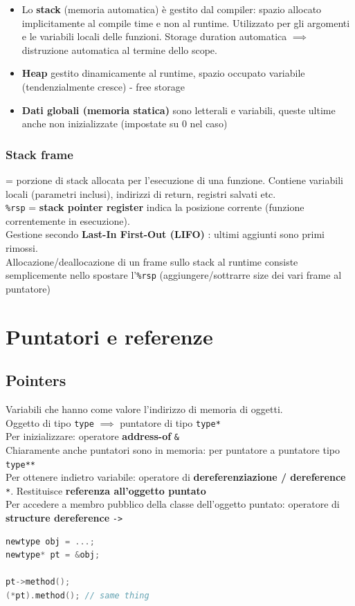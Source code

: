 \documentclass[10pt, oneside]{book}
\begin{document}
\begin{itemize}
\item Lo \textbf{stack} (memoria automatica) è gestito dal compiler: spazio allocato implicitamente al compile time e non al runtime. Utilizzato per gli argomenti e le variabili locali delle funzioni. Storage duration automatica $\implies$ distruzione automatica al termine dello scope.
\item \textbf{Heap} gestito dinamicamente al runtime, spazio occupato variabile (tendenzialmente cresce) - free storage
\item \textbf{Dati globali (memoria statica)} sono letterali e variabili, queste ultime anche non inizializzate (impostate su 0 nel caso)
\end{itemize}

\subsection{Stack frame}
= porzione di stack allocata per l'esecuzione di una funzione. Contiene variabili locali (parametri inclusi), indirizzi di return, registri salvati etc.\\
\texttt{\%rsp} = \textbf{stack pointer register} indica la posizione corrente (funzione correntemente in esecuzione).\\
Gestione secondo \textbf{Last-In First-Out (LIFO)} : ultimi aggiunti sono primi rimossi.\\
Allocazione/deallocazione di un frame sullo stack al runtime consiste semplicemente nello spostare l'\texttt{\%rsp} (aggiungere/sottrarre size dei vari frame al puntatore)



\chapter{Puntatori e referenze}

\section{Pointers}
Variabili che hanno come valore l'indirizzo di memoria di oggetti.\\
Oggetto di tipo \texttt{type} $\implies$ puntatore di tipo \texttt{type*}\\
Per inizializzare: operatore \textbf{address-of} \texttt{\&}\\
Chiaramente anche puntatori sono in memoria: per puntatore a puntatore tipo \texttt{type**}\\
Per ottenere indietro variabile: operatore di \textbf{dereferenziazione / dereference} \texttt{*}. Restituisce \textbf{referenza all'oggetto puntato}\\
Per accedere a membro pubblico della classe dell'oggetto puntato: operatore di \textbf{structure dereference} \texttt{->}
\begin{lstlisting}[language=C++]
newtype obj = ...;
newtype* pt = &obj;

pt->method();
(*pt).method(); // same thing
\end{lstlisting}
\end{document}
